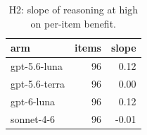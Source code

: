 \begin{table}[t]
\centering
\small
\caption{H2: slope of reasoning at high on per-item benefit.}
\label{tab:crt-b-h2}
\begin{tabular}{lrr}
\toprule
arm & items & slope \\
\midrule
gpt-5.6-luna & 96 & 0.12 \\
gpt-5.6-terra & 96 & 0.00 \\
gpt-6-luna & 96 & 0.12 \\
sonnet-4-6 & 96 & -0.01 \\
\bottomrule
\end{tabular}
\end{table}
